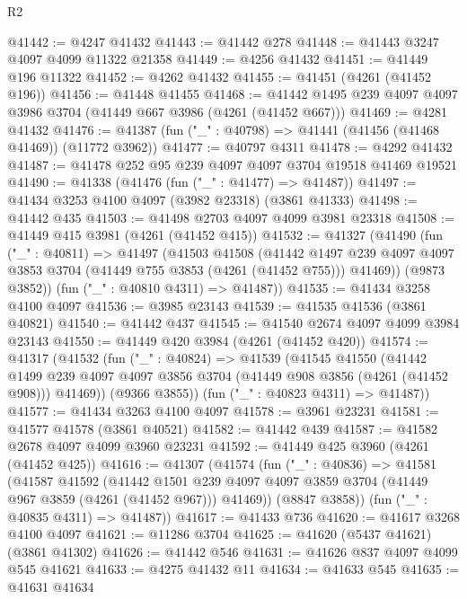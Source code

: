 \begin{lexlean}{R2}
\begin{coremodule}
@41442 := @4247 @41432
@41443 := @41442 @278
@41448 := @41443 @3247 @4097 @4099 @11322 @21358
@41449 := @4256 @41432
@41451 := @41449 @196 @11322
@41452 := @4262 @41432
@41455 := @41451 (@4261 (@41452 @196))
@41456 := @41448 @41455
@41468 := @41442 @1495 @239 @4097 @4097 @3986 @3704 (@41449 @667 @3986 (@4261 (@41452 @667)))
@41469 := @4281 @41432
@41476 := @41387 (fun ("_" : @40798) => @41441 (@41456 (@41468 @41469)) (@11772 @3962))
@41477 := @40797 @4311
@41478 := @4292 @41432
@41487 := @41478 @252 @95 @239 @4097 @4097 @3704 @19518 @41469 @19521
@41490 := @41338 (@41476 (fun ("_" : @41477) => @41487))
@41497 := @41434 @3253 @4100 @4097 (@3982 @23318) (@3861 @41333)
@41498 := @41442 @435
@41503 := @41498 @2703 @4097 @4099 @3981 @23318
@41508 := @41449 @415 @3981 (@4261 (@41452 @415))
@41532 := @41327
    (@41490
      (fun ("_" : @40811) =>
      @41497
        (@41503
          @41508
          (@41442
            @1497
            @239
            @4097
            @4097
            @3853
            @3704
            (@41449 @755 @3853 (@4261 (@41452 @755)))
            @41469))
        (@9873 @3852))
      (fun ("_" : @40810 @4311) => @41487))
@41535 := @41434 @3258 @4100 @4097
@41536 := @3985 @23143
@41539 := @41535 @41536 (@3861 @40821)
@41540 := @41442 @437
@41545 := @41540 @2674 @4097 @4099 @3984 @23143
@41550 := @41449 @420 @3984 (@4261 (@41452 @420))
@41574 := @41317
    (@41532
      (fun ("_" : @40824) =>
      @41539
        (@41545
          @41550
          (@41442
            @1499
            @239
            @4097
            @4097
            @3856
            @3704
            (@41449 @908 @3856 (@4261 (@41452 @908)))
            @41469))
        (@9366 @3855))
      (fun ("_" : @40823 @4311) => @41487))
@41577 := @41434 @3263 @4100 @4097
@41578 := @3961 @23231
@41581 := @41577 @41578 (@3861 @40521)
@41582 := @41442 @439
@41587 := @41582 @2678 @4097 @4099 @3960 @23231
@41592 := @41449 @425 @3960 (@4261 (@41452 @425))
@41616 := @41307
    (@41574
      (fun ("_" : @40836) =>
      @41581
        (@41587
          @41592
          (@41442
            @1501
            @239
            @4097
            @4097
            @3859
            @3704
            (@41449 @967 @3859 (@4261 (@41452 @967)))
            @41469))
        (@8847 @3858))
      (fun ("_" : @40835 @4311) => @41487))
@41617 := @41433 @736
@41620 := @41617 @3268 @4100 @4097
@41621 := @11286 @3704
@41625 := @41620 (@5437 @41621) (@3861 @41302)
@41626 := @41442 @546
@41631 := @41626 @837 @4097 @4099 @545 @41621
@41633 := @4275 @41432 @11
@41634 := @41633 @545
@41635 := @41631 @41634

\end{coremodule}
\end{lexlean}
